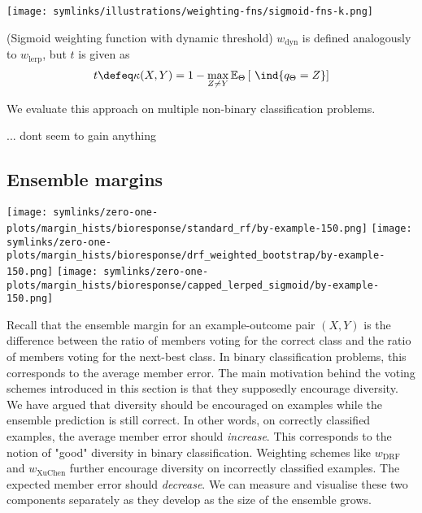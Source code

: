\documentclass[../main.tex]{subfiles}
\begin{document}
\begin{marginfigure}
    \texttt{[image: symlinks/illustrations/weighting-fns/sigmoid-fns-k.png]}
    \caption{$t = 1 - \frac{1}{8}$}
\end{marginfigure}
\begin{definition} (Sigmoid weighting function with dynamic threshold)
    $w_\text{dyn}$ is defined analogously to $w_\text{lerp}$, but $t$ is given as
    $$
    t \defeq \kappa(X,Y) = 1 - \max_{Z \not= Y} \mathbb{E}_{\Theta}\left[ ~\ind{q_{\Theta} = Z} \right] 
    $$
\end{definition}

We evaluate this approach on multiple non-binary classification problems.


\begin{observation} 
    ... dont seem to gain anything
\end{observation}

\subsection{Ensemble margins}

\begin{marginfigure}
    \texttt{[image: symlinks/zero-one-plots/margin\_hists/bioresponse/standard\_rf/by-example-150.png]}
    \texttt{[image: symlinks/zero-one-plots/margin\_hists/bioresponse/drf\_weighted\_bootstrap/by-example-150.png]}
    \texttt{[image: symlinks/zero-one-plots/margin\_hists/bioresponse/capped\_lerped\_sigmoid/by-example-150.png]}
    \caption{...}
    \label{fig:margin_hists}
\end{marginfigure}

Recall that the ensemble margin for an example-outcome pair $(X,Y)$ is the difference between the ratio of members voting for the correct class and the ratio of members voting for the next-best class. In binary classification problems, this corresponds to the average member error. 
The main motivation behind the voting schemes introduced in this section is that they supposedly encourage diversity. We have argued that diversity should be encouraged on examples while the ensemble prediction is still correct. In other words, on correctly classified examples, the average member error should \textit{increase}.
This corresponds to the notion of "good" diversity in binary classification. Weighting schemes like $w_{\text{DRF}}$ and $w_{\text{XuChen}}$ further encourage diversity on incorrectly classified examples. The expected member error should \textit{decrease}. 
We can measure and visualise these two components separately as they develop as the size of the ensemble grows.
\end{document}
